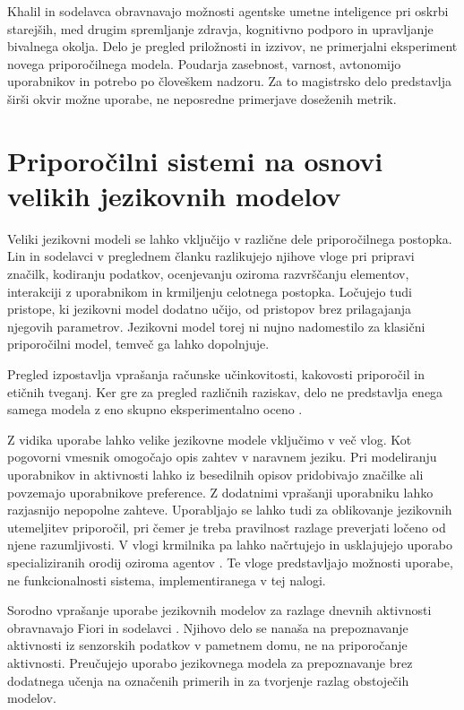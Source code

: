 \documentclass[a4paper,twoside,openright,12pt,slovene]{book}
\begin{document}
Khalil in sodelavca \cite{khalil2025elderly} obravnavajo
možnosti agentske umetne inteligence pri oskrbi
starejših, med drugim spremljanje zdravja,
kognitivno podporo in upravljanje bivalnega okolja.
Delo je pregled priložnosti in izzivov, ne primerjalni
eksperiment novega priporočilnega modela.
Poudarja zasebnost, varnost, avtonomijo uporabnikov
in potrebo po človeškem nadzoru. Za to magistrsko
delo predstavlja širši okvir možne uporabe,
ne neposredne primerjave doseženih metrik.


\section{Priporočilni sistemi na osnovi velikih jezikovnih modelov}
\label{sec:sota_llm}

Veliki jezikovni modeli se lahko vključijo v različne
dele priporočilnega postopka. Lin in sodelavci
\cite{lin2025llmsurvey} v preglednem članku razlikujejo
njihove vloge pri pripravi značilk, kodiranju podatkov,
ocenjevanju oziroma razvrščanju elementov, interakciji
z uporabnikom in krmiljenju celotnega postopka.
Ločujejo tudi pristope, ki jezikovni model dodatno
učijo, od pristopov brez prilagajanja njegovih
parametrov. Jezikovni model torej ni nujno nadomestilo
za klasični priporočilni model, temveč ga lahko
dopolnjuje.

Pregled izpostavlja vprašanja računske učinkovitosti,
kakovosti priporočil in etičnih tveganj.
Ker gre za pregled različnih raziskav, delo ne
predstavlja enega samega modela z eno skupno
eksperimentalno oceno \cite{lin2025llmsurvey}.

Z vidika uporabe lahko velike jezikovne modele vključimo
v več vlog. Kot pogovorni vmesnik omogočajo opis zahtev
v naravnem jeziku. Pri modeliranju uporabnikov in
aktivnosti lahko iz besedilnih opisov pridobivajo
značilke ali povzemajo uporabnikove preference.
Z dodatnimi vprašanji uporabniku lahko razjasnijo
nepopolne zahteve. Uporabljajo se lahko tudi za
oblikovanje jezikovnih utemeljitev priporočil,
pri čemer je treba pravilnost razlage preverjati
ločeno od njene razumljivosti. V vlogi krmilnika
pa lahko načrtujejo in usklajujejo uporabo
specializiranih orodij oziroma agentov
\cite{lin2025llmsurvey,huang2024agent,fiori2025activity}.
Te vloge predstavljajo možnosti uporabe, ne
funkcionalnosti sistema, implementiranega v tej nalogi.


Sorodno vprašanje uporabe jezikovnih modelov za
razlage dnevnih aktivnosti obravnavajo Fiori in
sodelavci \cite{fiori2025activity}. Njihovo delo
se nanaša na prepoznavanje aktivnosti iz senzorskih
podatkov v pametnem domu, ne na priporočanje
aktivnosti. Preučujejo uporabo jezikovnega modela
za prepoznavanje brez dodatnega učenja na označenih
primerih in za tvorjenje razlag obstoječih modelov.
\end{document}
